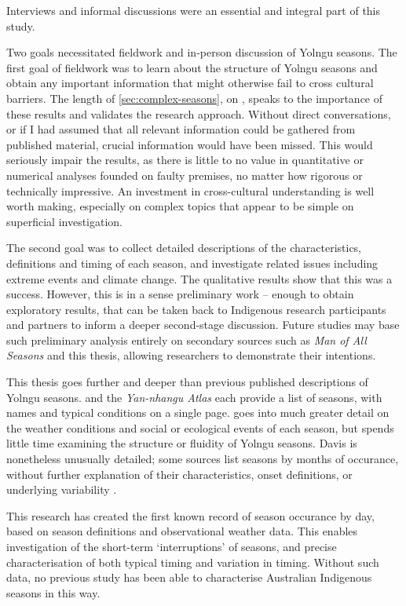 Interviews and informal discussions were an essential and integral part of
this study.

Two goals necessitated fieldwork and in-person discussion of Yolngu seasons.
The first goal of fieldwork  was to learn about the structure of Yolngu
seasons and obtain any important information that might otherwise
fail to cross cultural barriers.  The length of \cref{sec:complex-seasons},
on \textit{}, speaks to the importance of these
results and validates the research approach.
%
Without direct conversations, or if I had assumed that all relevant information
could be gathered from published material, crucial information would have been
missed.  This would seriously impair the results, as there is little to no value
in quantitative or numerical analyses
founded on faulty premises, no matter how rigorous or technically impressive.
An investment in cross-cultural understanding is well worth making, especially
on complex topics that appear to be simple on superficial investigation.

The second goal was to collect detailed descriptions of the characteristics,
definitions and timing of each season, and investigate related issues
including extreme events and climate change.  The qualitative results
show that this was a success.  However, this is in a sense preliminary work --
enough to obtain exploratory results, that can be taken back to Indigenous
research participants and partners to inform a deeper second-stage discussion.  Future
studies may base such preliminary analysis entirely on secondary sources
such as \textit{Man of All Seasons} \citep{davis1989} and this thesis,
allowing researchers to demonstrate their intentions.


This thesis goes further and deeper than previous published descriptions of Yolngu seasons.
\citet{barber2005} and the \textit{Yan-nhangu Atlas} \citep{atlas2014} each
provide a list of seasons, with names and typical conditions on a single page.
\citet{davis1989} goes into much greater detail on the weather conditions and
social or ecological events of each season, but spends little time examining
the structure or fluidity of Yolngu seasons.  Davis is nonetheless unusually
detailed; some sources \citep[eg.][]{BOM-iwk} list seasons by months of
occurance, without further explanation of their characteristics,
onset definitions, or underlying variability .


This research has created the first known record of season occurance by day,
based on season definitions and observational weather data.  This enables
investigation of the short-term `interruptions' of seasons, and precise
characterisation of both typical timing and variation in timing.  Without
such data, no previous study \citep[eg.][]{davis1989,barber2005,CSIROcals,BOM-iwk}
has been able to characterise Australian Indigenous seasons in this way.



